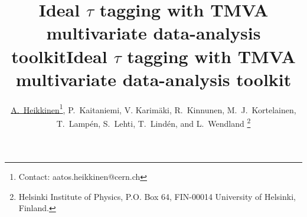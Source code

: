 \newif\ifPAPER  
\PAPERfalse  

\newcommand{\mytitle}{\title{Ideal $\tau$ tagging with TMVA multivariate data-analysis toolkit}}

\newcommand{\myauthor}{
\author{A.~Heikkinen} 
\affiliation{Helsinki Institute of Physics, P.O. Box 64, FIN-00014 University of Helsinki (Finland)}
}
\mytitle
\newcommand{\codeAlgorithm}[1]{
\addcontentsline{toc}{section}{Résumé}
\begin{center}\fbox{\parbox{12cm}{\bf #1}}\end{center}}

\newcommand{\cppintro}[1]{
\lstset{language=C,
caption= #1 ,
label=listing:boundary}}

\def\cppstart{\begin{lstlisting}}
\def\cppend{\end{lstlisting}}

\newif\ifCITENOTE 
\CITENOTEtrue

\ifPAPER

\else   %

\documentclass[slidestop,compress,xdvips,10pt]{beamer} 
\usepackage{graphicx}
\usepackage{hyperref}
\usepackage{listings}
\usepackage{verbatim} %
\transglitter[direction=315]
\usepackage{color} %


\makeatother
\beamertemplatetransparentcoveredhigh
\mytitle
\author{\underline{A.~Heikkinen}\footnote{Contact: aatos.heikkinen@cern.ch}, P.~Kaitaniemi, V. Karim\"{a}ki,
 R.~Kinnunen,  M.~J.~Kortelainen, T.~Lamp\'{e}n, S.~Lehti, T.~Lind\'{e}n, and L.~Wendland 
\footnote{Helsinki Institute of Physics, P.O. Box 64, FIN-00014 University of Helsinki, Finland.}}

